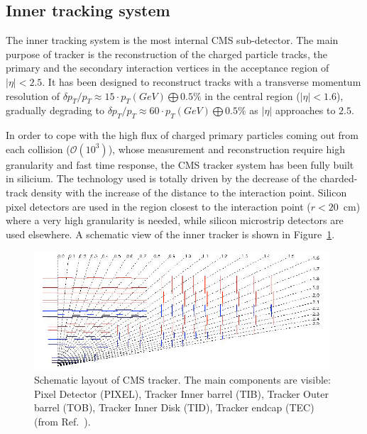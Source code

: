 \subsection{Inner tracking system}
\label{subsec:tracker}

The inner tracking system is the most internal CMS sub-detector.
The main purpose of tracker is the reconstruction of 
the charged particle tracks, the primary and the secondary interaction vertices 
in the acceptance region of $|\eta|<2.5$. 
It has been designed to reconstruct tracks with a transverse momentum resolution
of $\delta p_T/p_T \approx 15\cdot p_T(GeV)\bigoplus 0.5\%$ in the central region
($|\eta|<1.6$), gradually degrading to $\delta p_T/p_T \approx 60\cdot p_T(GeV)\bigoplus 0.5\%$ 
as $|\eta|$ approaches to $2.5$. 


In order to cope with the high flux of charged primary particles coming out from each collision
($\mathcal{O}(10^3)$), whose measurement and reconstruction require high granularity and
fast time response, the CMS tracker system has been fully built in silicium.
The technology used is totally driven by the decrease of the charded-track density 
with the increase of the distance to the interaction point. Silicon pixel detectors are used 
in the region closest to the interaction point ($r<20$~\si{cm})
where a very high granularity is needed, while silicon microstrip detectors are used elsewhere.
A schematic view of the inner tracker is shown in Figure~\ref{fig:trackerLayout}.

\begin{figure}[hbt]
  \begin{center}
    \includegraphics[width=0.98\textwidth]{figDetector/trackerLayout.png}
    \caption{Schematic layout of CMS tracker. The main components are visible:
             Pixel Detector (PIXEL), Tracker Inner barrel (TIB), Tracker Outer barrel
             (TOB), Tracker Inner Disk (TID), Tracker endcap (TEC) (from Ref.~\cite{Chatrchyan:1704291}).} 
    \label{fig:trackerLayout}
  \end{center}
\end{figure}

